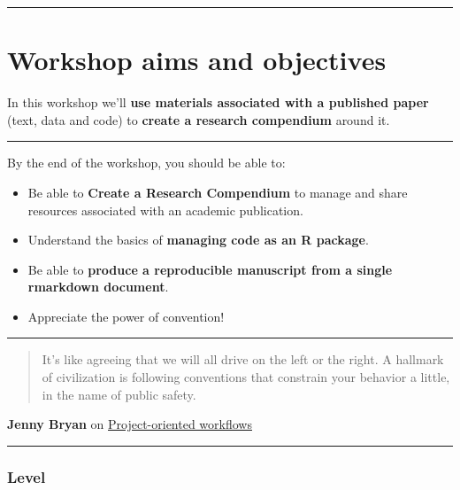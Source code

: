 \documentclass[
  letterpaper,
  DIV=11,
  numbers=noendperiod]{scrreprt}
\begin{document}
\begin{center}\rule{0.5\linewidth}{0.5pt}\end{center}


\hypertarget{workshop-aims-and-objectives}{%
\chapter*{Workshop aims and
objectives}\label{workshop-aims-and-objectives}}

In this workshop we'll \textbf{use materials associated with a published
paper} (text, data and code) to \textbf{create a research compendium}
around it.

\begin{center}\rule{0.5\linewidth}{0.5pt}\end{center}

By the end of the workshop, you should be able to:

\begin{itemize}
\item
  Be able to \textbf{Create a Research Compendium} to manage and share
  resources associated with an academic publication.
\item
  Understand the basics of \textbf{managing code as an R package}.
\item
  Be able to \textbf{produce a reproducible manuscript from a single
  rmarkdown document}.
\item
  Appreciate the power of convention!
\end{itemize}

\begin{center}\rule{0.5\linewidth}{0.5pt}\end{center}

\begin{quote}
It's like agreeing that we will all drive on the left or the right. A
hallmark of civilization is following conventions that constrain your
behavior a little, in the name of public safety.
\end{quote}

\textbf{Jenny Bryan} on
\href{https://www.tidyverse.org/articles/2017/12/workflow-vs-script/}{Project-oriented
workflows}

\begin{center}\rule{0.5\linewidth}{0.5pt}\end{center}

\hypertarget{level-1}{%
\subsection*{Level}\label{level-1}}
\end{document}
